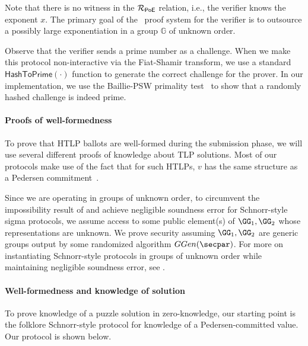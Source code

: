Note that there is no witness in the $\mathcal{R}_{\mathsf{PoE}}$ relation, i.e., the verifier knows the exponent $x$. The primary goal of the \poe\ proof system for the verifier is to outsource a possibly large exponentiation in a group $\mathbb{G}$ of unknown order.



Observe that the verifier sends a prime number as a challenge. When we make this protocol non-interactive via the Fiat-Shamir transform, we use a standard $\textsf{HashToPrime}(\cdot)$ function to generate the correct challenge for the prover. In our implementation, we use the Baillie-PSW primality test~\cite{PomSelWag80} to show that a randomly hashed challenge is indeed prime. 

\paragraph{Proofs of well-formedness}

To prove that HTLP ballots are well-formed during the submission phase, we will use several different proofs of knowledge about TLP solutions. 
Most of our protocols make use of the fact that for such HTLPs, $v$ has the same structure as a Pedersen commitment~\cite{C:Pedersen91}.


Since we are operating in groups of unknown order, to circumvent the impossibility result of \cite{TCC:BanCamKre10} and achieve negligible soundness error for Schnorr-style sigma protocols, we assume access to some public element(s) of $\GG_1, \GG_2$ whose representations are unknown. We prove security assuming $\GG_1, \GG_2$ are generic groups output by some randomized algorithm $GGen(\secpar)$.
For more on instantiating Schnorr-style protocols in groups of unknown order while maintaining negligible soundness error, see \cite{C:BonBunFis19}.

\paragraph{Well-formedness and knowledge of solution} 
To prove knowledge of a puzzle solution in zero-knowledge, our starting point is the folklore Schnorr-style protocol for knowledge of a Pedersen-committed value. Our protocol \zkpoks is shown below.


